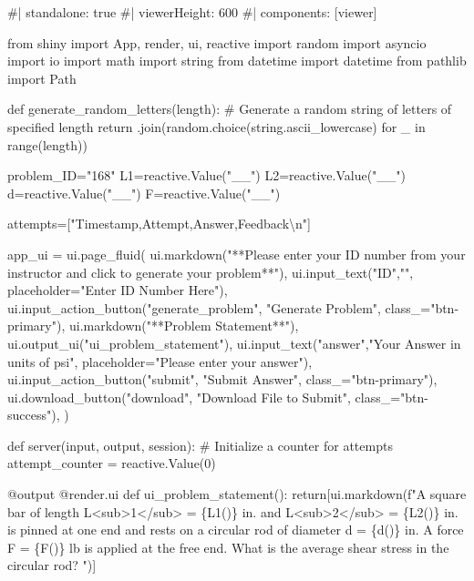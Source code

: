 \documentclass[
  letterpaper,
  DIV=11,
  numbers=noendperiod]{scrreprt}
\newenvironment{Shaded}{\begin{snugshade}}{\end{snugshade}}
\newcommand{\NormalTok}[1]{\textcolor[rgb]{0.00,0.23,0.31}{#1}}
\begin{document}
\begin{Shaded}
\begin{Highlighting}[]
\NormalTok{\#| standalone: true}
\NormalTok{\#| viewerHeight: 600}
\NormalTok{\#| components: [viewer]}

\NormalTok{from shiny import App, render, ui, reactive}
\NormalTok{import random}
\NormalTok{import asyncio}
\NormalTok{import io}
\NormalTok{import math}
\NormalTok{import string}
\NormalTok{from datetime import datetime}
\NormalTok{from pathlib import Path}

\NormalTok{def generate\_random\_letters(length):}
\NormalTok{    \# Generate a random string of letters of specified length}
\NormalTok{    return \textquotesingle{}\textquotesingle{}.join(random.choice(string.ascii\_lowercase) for \_ in range(length)) }

\NormalTok{problem\_ID="168"}
\NormalTok{L1=reactive.Value("\_\_")}
\NormalTok{L2=reactive.Value("\_\_")}
\NormalTok{d=reactive.Value("\_\_")}
\NormalTok{F=reactive.Value("\_\_")}


\NormalTok{attempts=["Timestamp,Attempt,Answer,Feedback\textbackslash{}n"]}

\NormalTok{app\_ui = ui.page\_fluid(}
\NormalTok{    ui.markdown("**Please enter your ID number from your instructor and click to generate your problem**"),}
\NormalTok{    ui.input\_text("ID","", placeholder="Enter ID Number Here"),}
\NormalTok{    ui.input\_action\_button("generate\_problem", "Generate Problem", class\_="btn{-}primary"),}
\NormalTok{    ui.markdown("**Problem Statement**"),}
\NormalTok{    ui.output\_ui("ui\_problem\_statement"),}
\NormalTok{    ui.input\_text("answer","Your Answer in units of psi", placeholder="Please enter your answer"),}
\NormalTok{    ui.input\_action\_button("submit", "Submit Answer", class\_="btn{-}primary"),}
\NormalTok{    ui.download\_button("download", "Download File to Submit", class\_="btn{-}success"),}
\NormalTok{)}


\NormalTok{def server(input, output, session):}
\NormalTok{    \# Initialize a counter for attempts}
\NormalTok{    attempt\_counter = reactive.Value(0)}

\NormalTok{    @output}
\NormalTok{    @render.ui}
\NormalTok{    def ui\_problem\_statement():}
\NormalTok{        return[ui.markdown(f"A square bar of length L\textless{}sub\textgreater{}1\textless{}/sub\textgreater{} = \{L1()\} in. and L\textless{}sub\textgreater{}2\textless{}/sub\textgreater{} = \{L2()\} in. is pinned at one end and rests on a circular rod of diameter d = \{d()\} in. A force F = \{F()\} lb is applied at the free end. What is the average shear stress in the circular rod? ")]}
    

\end{Highlighting}
\end{Shaded}
\end{document}

